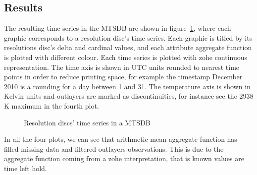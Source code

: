 \subsection{Results}

The resulting time series in the MTSDB are shown in
figure~\ref{fig:exemple:4mrd}, where each graphic corresponds to a
resolution disc's time series. Each graphic is titled by its
resolutions disc's delta and cardinal values, and each attribute
aggregate function is plotted with different colour.  Each time series
is plotted with zohe continuous representation. The time axis is shown
in UTC units rounded to nearest time points in order to reduce
printing space, for example the timestamp December 2010 is a rounding
for a day between 1 and 31. The temperature axis is shown in Kelvin
units and outlayers are marked as discontinuities, for instance see
the 2938 K maximum in the fourth plot.


\begin{figure}[tp]
  \centering
  
  \caption{Resolution discs' time series in a MTSDB}
  \label{fig:exemple:4mrd}
\end{figure}


In all the four plots, we can see that arithmetic mean aggregate
function has filled missing data and filtered outlayers
observations. This is due to the aggregate function coming from a zohe
interpretation, that is known values are time left hold. 





